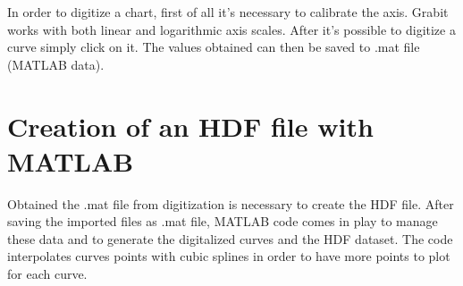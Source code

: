 In order to digitize a chart, first of all it's necessary to calibrate the axis. Grabit works with both linear and logarithmic axis scales. After it's possible to digitize a curve simply click on it. The values obtained can then be saved to .mat file (MATLAB data).

\section{Creation of an HDF file with MATLAB}
\label{secA.2}

Obtained the .mat file from digitization is necessary to create the HDF file. After saving the imported files as .mat file, MATLAB code comes in play to manage these data and to generate the digitalized curves and the HDF dataset.  The code interpolates curves points with cubic splines in order to have more points to plot for each curve.

